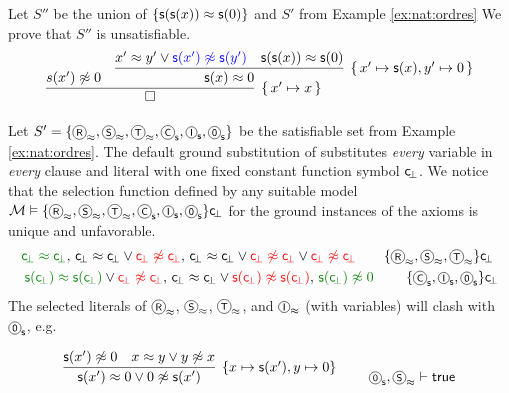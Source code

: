 \begin{example} 
	Let \( S'' \) be the 
	union of \( \{ \mathsf{s}(\mathsf{s}(x))\approx\mathsf{s}(0) \} \)
	and \( S' \) from Example \vref{ex:nat:ordres}
	We prove that \( S'' \) is unsatisfiable.
	\begin{gather*}
	\infer[ \{ \, x'\mapsto x \, \}]
	{\square}
	{s(x')\mNE 0 &
		\infer[
		 \{ \, x'\mapsto \msucc(x), y'\mapsto 0 \, \}
		]{
			\msucc(x)\mEQ 0
		}{
			x' \mEQ y' \lor {\colN \msucc(x') \mNE \msucc(y')}
			& {\msucc(\msucc(x))\mEQ\msucc(0)}
		}
	}
	\end{gather*}
\end{example}

\begin{example}\label{ex:nat:instgen}
	Let \( S' = \{
		\axiom{R}_\mEQ, \axiom{S}_\mEQ, \axiom{T}_\mEQ,
		\axiom{C}_\msucc, \axiom{I}_\msucc, \axiom{0}_\msucc
		\}\) 
		be the satisfiable set from Example \vref{ex:nat:ordres}.
	The default ground substitution of \InstGen{} substitutes \emph{every} 
	variable in \emph{every} clause and literal with one fixed constant function symbol \( \mathsf{c} \!_\bot \). 
	We notice that the selection function defined 
	by any suitable model \(
		\mcM \entails \{
			\axiom{R}_\mEQ, \axiom{S}_\mEQ, \axiom{T}_\mEQ,
			\axiom{C}_\msucc, \axiom{I}_\msucc, \axiom{0}_\msucc
			\}\consbot
	\) for the ground instances of the axioms is unique and unfavorable.
	\begin{align*}
	{ \colHi \consbot \mEQ \consbot },\,
	{ \consbot \mEQ \consbot} \lor { \colLo \consbot \mNE \consbot }
	,\,
	{ \consbot \mEQ \consbot}
	\lor {\colLo \consbot \mNE \consbot}
	\lor {\colLo \consbot\mNE \consbot}
	\tag*{\( \{\axiom{R}_\mEQ, \axiom{S}_\mEQ, \axiom{T}_\mEQ\}\consbot \) }\\
	{\colHi \msucc(\consbot) \mEQ \msucc(\consbot)} \lor {\colLo \consbot \mNE \consbot}
	,\,
	{ \consbot \mEQ \consbot} \lor {\colLo \msucc(\consbot) \mNE \msucc(\consbot)}
	,\,
	{\colHi \msucc(\consbot) \mNE 0}
	\tag*{ \( \{\axiom{C}_\msucc, \axiom{I}_\msucc, \axiom{0}_\msucc \}\consbot \)}
	\end{align*}
	The selected literals of 
	\(\axiom{R}_\mEQ\), \(\axiom{S}_\mEQ\), \(\axiom{T}_\mEQ\), and \(\axiom{I}_\mEQ\) 
	(with variables) will clash with
	\(\axiom{0}_\msucc\), e.g.

	\begin{align*}
		\infer[\{ x\mapsto \msucc(x'), y\mapsto 0 \}]{
			\msucc(x') \mEQ 0 \lor 0 \mNE \msucc(x')
		}{
			\msucc(x')\mNE 0 & x \mEQ y  \lor y \mNE x
		}
		\tag*{ \( \axiom{0}_\msucc, \axiom{S}_\mEQ \proves \true \)}
		\end{align*}


\end{example}
